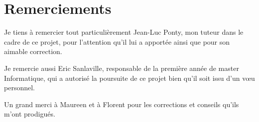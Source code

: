 \section*{Remerciements}

Je tiens à remercier tout particulièrement Jean-Luc Ponty, mon tuteur
dans le cadre de ce projet, pour l'attention qu'il lui a apportée
ainsi que pour son aimable correction.

Je remercie aussi Eric Sanlaville, responsable de la première année de
master Informatique, qui a autorisé la poursuite de ce projet bien
qu'il soit issu d'un v\oe u personnel.

Un grand merci à Maureen et à Florent pour les corrections et conseils
qu'ils m'ont prodigués. \\
